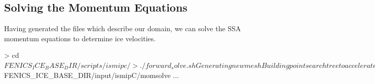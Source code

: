 \documentclass[11pt, reqno, nocenter]{article}
\begin{document}
\subsection{Solving the Momentum Equations}

Having generated the files which describe our domain, we can solve the SSA momentum equations to determine ice velocities. 

\begin{spverbatim}
> cd $FENICS_ICE_BASE_DIR/scripts/ismipc/ 
> ./forward_solve.sh

Generating new mesh                                                                                                                                              
Building point search tree to accelerate distance queries.                                                                                                       
Computed bounding box tree with 39999 nodes for 20000 points.                                                                                                    
Solving nonlinear variational problem.                                                                                                                             
Newton iteration 0: r (abs) = 1.585e+03 (tol = 1.000e-08) r (rel) = 1.000e+00 (tol = 5.000e-02)                                                                 
Newton iteration 1: r (abs) = 1.139e+02 (tol = 1.000e-08) r (rel) = 7.186e-02 (tol = 5.000e-02)                                                                 
Newton iteration 2: r (abs) = 1.307e+02 (tol = 1.000e-08) r (rel) = 8.248e-02 (tol = 5.000e-02)                                                                  
Newton iteration 3: r (abs) = 9.443e+01 (tol = 1.000e-08) r (rel) = 5.958e-02 (tol = 5.000e-02)                                                                  
Newton iteration 4: r (abs) = 5.682e+01 (tol = 1.000e-08) r (rel) = 3.585e-02 (tol = 5.000e-02)                                                                 
Newton solver finished in 5 iterations and 5 linear solver iterations.                                                                                         
Solving nonlinear variational problem.                                                                                                                          
Newton iteration 0: r (abs) = 6.650e+01 (tol = 1.000e-05) r (rel) = 1.000e+00 (tol = 1.000e-05)                                                                 
Newton iteration 1: r (abs) = 4.913e+00 (tol = 1.000e-05) r (rel) = 7.387e-02 (tol = 1.000e-05)                                                                  
Newton iteration 2: r (abs) = 4.393e-02 (tol = 1.000e-05) r (rel) = 6.606e-04 (tol = 1.000e-05)                                                                 
Newton iteration 3: r (abs) = 5.647e-06 (tol = 1.000e-05) r (rel) = 8.492e-08 (tol = 1.000e-05)                                                                 
Newton solver finished in 4 iterations and 4 linear solver iterations.                                                                                           
Time for solve: 4.667648553848267      

ls $FENICS_ICE_BASE_DIR/input/ismipC/momsolve
...
\end{spverbatim}
\end{document}
